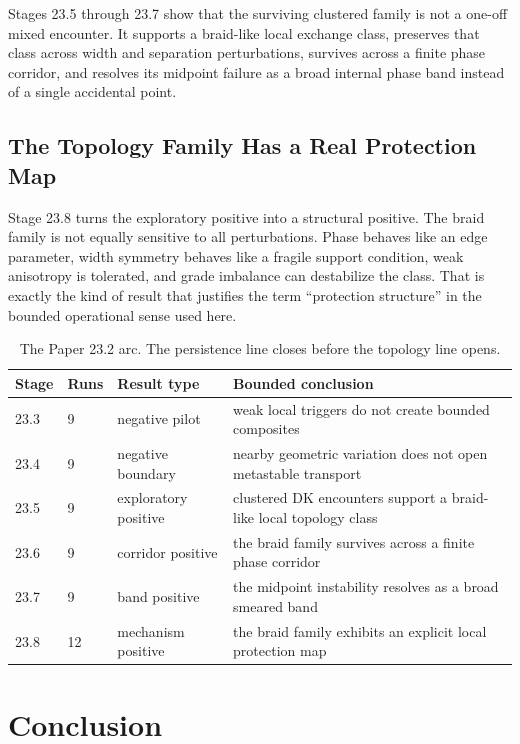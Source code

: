 \documentclass[11pt]{article}
\begin{document}
Stages 23.5 through 23.7 show that the surviving clustered family is not a one-off mixed encounter. It supports a braid-like local exchange class, preserves that class across width and separation perturbations, survives across a finite phase corridor, and resolves its midpoint failure as a broad internal phase band instead of a single accidental point.

\subsection{The Topology Family Has a Real Protection Map}

Stage 23.8 turns the exploratory positive into a structural positive. The braid family is not equally sensitive to all perturbations. Phase behaves like an edge parameter, width symmetry behaves like a fragile support condition, weak anisotropy is tolerated, and grade imbalance can destabilize the class. That is exactly the kind of result that justifies the term ``protection structure'' in the bounded operational sense used here.

\begin{table}[h]
\centering
\scriptsize
\begin{tabular}{@{}p{0.7in}p{0.5in}p{1.2in}p{2.7in}@{}}
\toprule
Stage & Runs & Result type & Bounded conclusion \\
\midrule
23.3 & 9 & negative pilot & weak local triggers do not create bounded composites \\
23.4 & 9 & negative boundary & nearby geometric variation does not open metastable transport \\
23.5 & 9 & exploratory positive & clustered DK encounters support a braid-like local topology class \\
23.6 & 9 & corridor positive & the braid family survives across a finite phase corridor \\
23.7 & 9 & band positive & the midpoint instability resolves as a broad smeared band \\
23.8 & 12 & mechanism positive & the braid family exhibits an explicit local protection map \\
\bottomrule
\end{tabular}
\caption{The Paper 23.2 arc. The persistence line closes before the topology line opens.}
\end{table}

\section{Conclusion}
\end{document}
